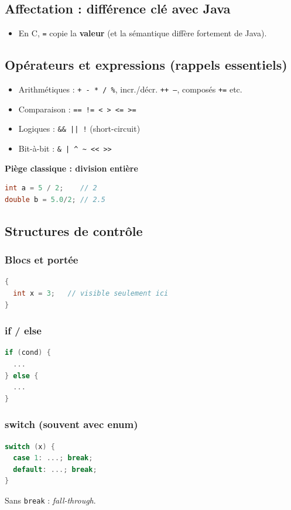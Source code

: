 \subsection{Affectation : différence clé avec Java}
\begin{itemize}
  \item En C, \texttt{=} copie la \textbf{valeur} (et la sémantique diffère fortement de Java). 
\end{itemize}

\subsection{Opérateurs et expressions (rappels essentiels)}
\begin{itemize}
  \item Arithmétiques : \texttt{+ - * / \%}, incr./décr. \texttt{++ --}, composés \texttt{+=} etc.
  \item Comparaison : \texttt{== != < > <= >=}
  \item Logiques : \texttt{\&\& || !} (short-circuit)
  \item Bit-à-bit : \texttt{\& | \^{} \~{} << >>}
\end{itemize}

\textbf{Piège classique : division entière}
\begin{lstlisting}[language=C]
int a = 5 / 2;    // 2
double b = 5.0/2; // 2.5
\end{lstlisting}

\subsection{Structures de contrôle}
\subsubsection{Blocs et portée}
\begin{lstlisting}[language=C]
{
  int x = 3;   // visible seulement ici
}
\end{lstlisting}

\subsubsection{if / else}
\begin{lstlisting}[language=C]
if (cond) {
  ...
} else {
  ...
}
\end{lstlisting}

\subsubsection{switch (souvent avec enum)}
\begin{lstlisting}[language=C]
switch (x) {
  case 1: ...; break;
  default: ...; break;
}
\end{lstlisting}
Sans \texttt{break} : \textit{fall-through}.

